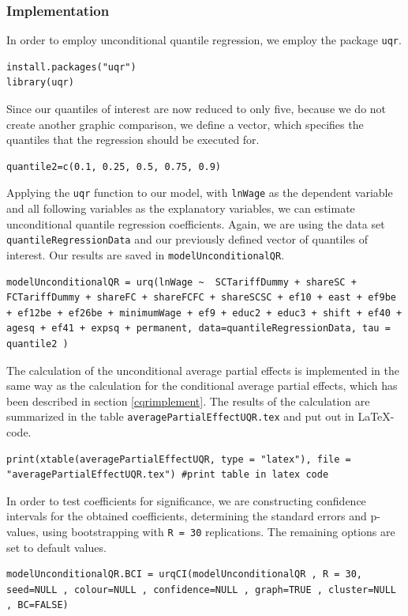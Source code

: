 \subsubsection*{Implementation}
In order to employ unconditional quantile regression, we employ the package \texttt{uqr}.
\lstset{firstnumber = 491}
\begin{lstlisting}
install.packages("uqr")
library(uqr)
\end{lstlisting}
Since our quantiles of interest are now reduced to only five, because we do not create another graphic comparison, we define a vector, which specifies the quantiles that the regression should be executed for.
\lstset{firstnumber = 494}
\begin{lstlisting}
quantile2=c(0.1, 0.25, 0.5, 0.75, 0.9)
\end{lstlisting}
Applying the \texttt{uqr} function to our model, with \texttt{lnWage} as the dependent variable and all following variables as the explanatory variables, we can estimate unconditional quantile regression coefficients. Again, we are using the data set \texttt{quantileRegressionData} and our previously defined vector of quantiles of interest. Our results are saved in \texttt{modelUnconditionalQR}.
\lstset{firstnumber = 495}
\begin{lstlisting}
modelUnconditionalQR = urq(lnWage ~  SCTariffDummy + shareSC + FCTariffDummy + shareFC + shareFCFC + shareSCSC + ef10 + east + ef9be + ef12be + ef26be + minimumWage + ef9 + educ2 + educ3 + shift + ef40 + agesq + ef41 + expsq + permanent, data=quantileRegressionData, tau = quantile2 )
\end{lstlisting}
The calculation of the unconditional average partial effects is implemented in the same way as the calculation for the conditional average partial effects, which has been described in section \ref{cqrimplement}. The results of the calculation are summarized in the table \texttt{\dq averagePartialEffectUQR.tex\dq} and put out in \LaTeX-code.
\lstset{firstnumber = 518}
\begin{lstlisting}
print(xtable(averagePartialEffectUQR, type = "latex"), file = "averagePartialEffectUQR.tex") #print table in latex code
\end{lstlisting}
In order to test coefficients for significance, we are constructing confidence intervals for the obtained coefficients, determining the standard errors and p-values, using bootstrapping with \texttt{R = 30} replications. The remaining options are set to default values.
\lstset{firstnumber = 521}
\begin{lstlisting}
modelUnconditionalQR.BCI = urqCI(modelUnconditionalQR , R = 30, seed=NULL , colour=NULL , confidence=NULL , graph=TRUE , cluster=NULL , BC=FALSE)
\end{lstlisting}
